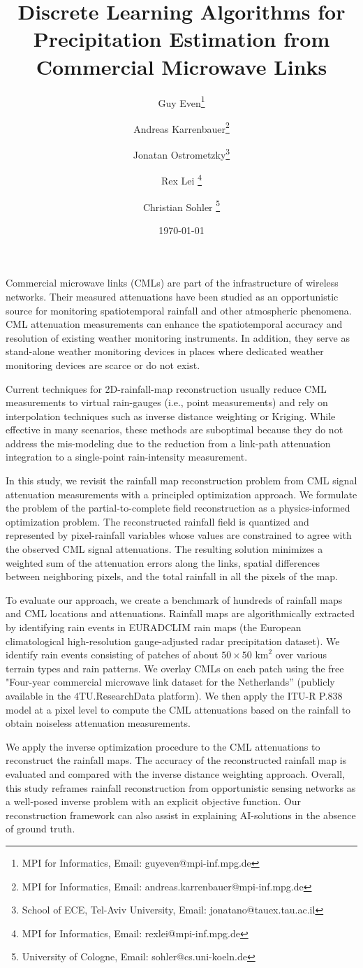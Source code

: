 \documentclass{article}
\title{Discrete Learning Algorithms for Precipitation Estimation from Commercial Microwave Links}
\author{Guy Even\thanks{MPI for Informatics, Email: guyeven@mpi-inf.mpg.de} 
\and
Andreas Karrenbauer\thanks{MPI for Informatics, Email: andreas.karrenbauer@mpi-inf.mpg.de}
\and Jonatan Ostrometzky\thanks{School of ECE, Tel-Aviv University, Email: jonatano@tauex.tau.ac.il}
\and Rex Lei \thanks{MPI for Informatics, Email: rexlei@mpi-inf.mpg.de}
\and Christian Sohler \thanks{University of Cologne, Email: sohler@cs.uni-koeln.de}}
\date{\today}
\begin{document}
\maketitle

Commercial microwave links (CMLs) are part of the infrastructure of wireless networks.  Their measured attenuations have been studied as an opportunistic source for monitoring spatiotemporal rainfall and other atmospheric phenomena. CML attenuation measurements can enhance the spatiotemporal accuracy and resolution of existing weather monitoring instruments. In addition, they serve as stand-alone weather monitoring devices in places where dedicated weather monitoring devices are scarce or do not exist.

Current techniques for 2D-rainfall-map reconstruction usually reduce CML measurements to virtual rain-gauges (i.e., point measurements) and rely on interpolation techniques such as inverse distance weighting or Kriging. While effective in many scenarios, these methods are suboptimal because they do not address the mis-modeling due to the reduction from a link-path attenuation integration to a single-point rain-intensity measurement.

In this study, we revisit the rainfall map reconstruction problem from CML signal attenuation measurements with a principled optimization approach. We formulate the problem of the partial-to-complete field reconstruction as a physics-informed optimization problem. The reconstructed rainfall field is quantized and represented by pixel-rainfall variables whose values are constrained to agree with the observed CML signal attenuations. The resulting solution minimizes a weighted sum of the attenuation errors along the links, spatial differences between neighboring pixels, and the total rainfall in all the pixels of the map. 

To evaluate our approach, we create a benchmark of hundreds of rainfall maps and CML locations and attenuations.
Rainfall maps are algorithmically extracted by identifying rain events in EURADCLIM rain maps (the European climatological high-resolution gauge-adjusted radar precipitation dataset). We identify rain events consisting of patches of about $50\times 50$ $\text{km}^2$ over various terrain types and rain patterns.
We overlay CMLs on each patch using the free "Four-year commercial microwave link dataset for the Netherlands'' (publicly available in the 4TU.ResearchData platform).
We then apply the ITU-R P.838 model at a pixel level to compute the CML attenuations based on the rainfall to obtain noiseless attenuation measurements. 

We apply the inverse optimization procedure to the CML attenuations to reconstruct the rainfall maps. The accuracy of the reconstructed rainfall map is evaluated and compared with the inverse distance weighting approach.
Overall, this study reframes rainfall reconstruction from opportunistic sensing networks as a well-posed inverse problem with an explicit objective function.
Our reconstruction framework can also assist in explaining AI-solutions in the absence of ground truth. 
\end{document}
